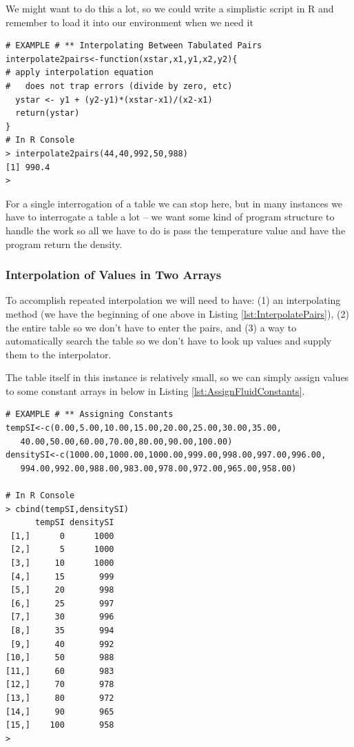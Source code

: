 We might want to do this a lot, so we could write a simplistic script in R and remember to load it into our environment when we need it

\begin{lstlisting}[caption=R code demonstrating the interpolation equation, label=lst:InterpolatePairs]
# EXAMPLE # ** Interpolating Between Tabulated Pairs
interpolate2pairs<-function(xstar,x1,y1,x2,y2){
# apply interpolation equation
#   does not trap errors (divide by zero, etc)
  ystar <- y1 + (y2-y1)*(xstar-x1)/(x2-x1)
  return(ystar)
}
# In R Console
> interpolate2pairs(44,40,992,50,988)
[1] 990.4
> 
\end{lstlisting}   

For a single interrogation of a table we can stop here, but in many instances we have to interrogate a table a lot -- we want some kind of program structure to handle the work so all we have to do is pass the temperature value and have the program return the density.

\subsubsection{Interpolation of Values in Two Arrays}
To accomplish repeated interpolation we will need to have: (1) an interpolating method (we have the beginning of one above in Listing \ref{lst:InterpolatePairs}), (2) the entire table so we don't have to enter the pairs, and (3) a way to  automatically search the table so we don't have to look up values and supply them to the interpolator.

The table itself in this instance is relatively small, so we can simply assign values to some constant arrays in below in Listing \ref{lst:AssignFluidConstants}.

\begin{lstlisting}[caption=R code assigning Liquid Properties, label=lst:AssignFluidConstants]
# EXAMPLE # ** Assigning Constants
tempSI<-c(0.00,5.00,10.00,15.00,20.00,25.00,30.00,35.00,
   40.00,50.00,60.00,70.00,80.00,90.00,100.00)
densitySI<-c(1000.00,1000.00,1000.00,999.00,998.00,997.00,996.00,
   994.00,992.00,988.00,983.00,978.00,972.00,965.00,958.00)

# In R Console
> cbind(tempSI,densitySI)
      tempSI densitySI
 [1,]      0      1000
 [2,]      5      1000
 [3,]     10      1000
 [4,]     15       999
 [5,]     20       998
 [6,]     25       997
 [7,]     30       996
 [8,]     35       994
 [9,]     40       992
[10,]     50       988
[11,]     60       983
[12,]     70       978
[13,]     80       972
[14,]     90       965
[15,]    100       958
> 
\end{lstlisting}  

